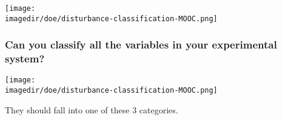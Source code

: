 \begin{comment}
		
	\begin{frame}\frametitle{\texttt{[image: \\imagedir/doe/examples/advice-logo.png]}\,\, plan your experiments carefully ahead of time}
	\end{frame}
	
	\begin{columns}[T]
		\column{0.45\textwidth}
			\texttt{[image: \\imagedir/statistics/flicfcb\_o.jpg]}
		
			{\scriptsize (p. 230 in Box, Hunter and Hunter, 2$^\text{nd}$ ed)}
		
		\column{0.48\textwidth}
			\texttt{[image: \\imagedir/doe/examples/solar-panel-mendelu-cz-website.png]}
		
		
			\see{\href{http://yint.org/solar-panel-study}{http://yint.org/solar-panel-study}}
	\end{columns}
	
	\begin{center}\rule[8mm]{4cm}{0.01cm}\end{center}
	\rule[3mm]{0.01cm}{25mm}%
	
\end{comment}

\begin{frame}\frametitle{}
	\begin{center}
		\texttt{[image: \\imagedir/doe/disturbance-classification-MOOC.png]}
	\end{center}
\end{frame}

\begin{frame}\frametitle{Can you classify all the variables in your experimental system?}
	\begin{center}
		\texttt{[image: \\imagedir/doe/disturbance-classification-MOOC.png]}
	\end{center}
	They should fall into one of these 3 categories.
\end{frame}

